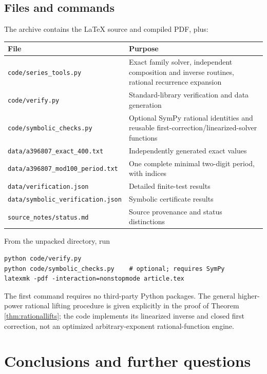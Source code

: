 \documentclass[11pt,letterpaper]{article}
\theoremstyle{definition}
\theoremstyle{remark}
\begin{document}
\subsection{Files and commands}
The archive contains the LaTeX source and compiled PDF, plus:
\begin{center}
\begin{tabular}{@{}p{}p{}@{}}
\toprule
File & Purpose\\
\midrule
\texttt{code/series\_tools.py} & Exact family solver, independent
 composition and inverse routines, rational recurrence expansion\\[3pt]
\texttt{code/verify.py} & Standard-library verification and data generation\\[3pt]
\texttt{code/symbolic\_checks.py} & Optional SymPy rational identities and
 reusable first-correction/linearized-solver functions\\[3pt]
\texttt{data/a396807\_exact\_400.txt} & Independently generated exact values\\[3pt]
\texttt{data/a396807\_mod100\_period.txt} & One complete minimal two-digit
 period, with indices\\[3pt]
\texttt{data/verification.json} & Detailed finite-test results\\[3pt]
\texttt{data/symbolic\_verification.json} & Symbolic certificate results\\[3pt]
\texttt{source\_notes/status.md} & Source provenance and status distinctions\\
\bottomrule
\end{tabular}
\end{center}
From the unpacked directory, run
\begin{lstlisting}
python code/verify.py
python code/symbolic_checks.py    # optional; requires SymPy
latexmk -pdf -interaction=nonstopmode article.tex
\end{lstlisting}
The first command requires no third-party Python packages.  The general
higher-power rational lifting procedure is given explicitly in the
proof of Theorem \ref{thm:rationallifts}; the code implements its
linearized inverse and closed first correction, not an optimized
arbitrary-exponent rational-function engine.

\section{Conclusions and further questions}\label{sec:conclusion}
\end{document}
